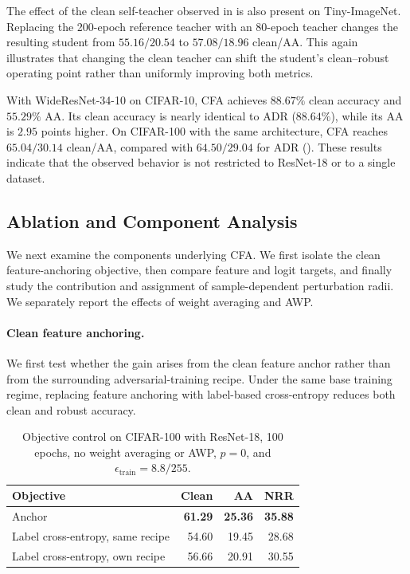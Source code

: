 The effect of the clean self-teacher observed in
 is also present on Tiny-ImageNet.
Replacing the 200-epoch reference teacher with an 80-epoch teacher changes
the resulting student from \(55.16/20.54\) to \(57.08/18.96\)
clean/AA.
This again illustrates that changing the clean teacher can shift the
student's clean--robust operating point rather than uniformly improving both
metrics.

With WideResNet-34-10 on CIFAR-10, CFA achieves \(88.67\%\) clean accuracy
and \(55.29\%\) AA.
Its clean accuracy is nearly identical to ADR
(\(88.64\%\)), while its AA is \(2.95\) points higher.
On CIFAR-100 with the same architecture, CFA reaches
\(65.04/30.14\) clean/AA, compared with \(64.50/29.04\) for ADR
().
These results indicate that the observed behavior is not restricted to
ResNet-18 or to a single dataset.


\subsection{Ablation and Component Analysis}
\label{sec:components}

We next examine the components underlying CFA.
We first isolate the clean feature-anchoring objective, then compare feature
and logit targets, and finally study the contribution and assignment of
sample-dependent perturbation radii.
We separately report the effects of weight averaging and AWP.


\paragraph{Clean feature anchoring.}

We first test whether the gain arises from the clean feature anchor rather
than from the surrounding adversarial-training recipe.
Under the same base training regime, replacing feature anchoring with
label-based cross-entropy reduces both clean and robust accuracy.

\begin{table}[!htbp]
  \centering
  \small
  \setlength{\tabcolsep}{5pt}
  \caption{
  Objective control on CIFAR-100 with ResNet-18, 100 epochs, no weight
  averaging or AWP, \(p=0\), and
  \(\epsilon_{\mathrm{train}}=8.8/255\).
  }
  \label{tab:controls}
  \begin{tabular}{lrrr}
    \toprule
    Objective & Clean & AA & NRR \\
    \midrule
    Anchor
      & \textbf{61.29} & \textbf{25.36} & \textbf{35.88} \\
    Label cross-entropy, same recipe
      & 54.60 & 19.45 & 28.68 \\
    Label cross-entropy, own recipe
      & 56.66 & 20.91 & 30.55 \\
    \bottomrule
  \end{tabular}
\end{table}

